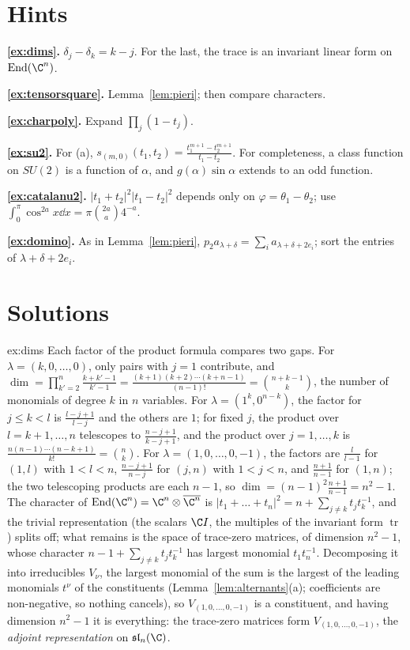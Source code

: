 \section{Hints}

\noindent\textbf{\ref{ex:dims}.} $\delta_j-\delta_k=k-j$. For the last, the trace is an invariant linear form on $\operatorname{End}(\C^n)$.

\noindent\textbf{\ref{ex:tensorsquare}.} Lemma~\ref{lem:pieri}; then compare characters.

\noindent\textbf{\ref{ex:charpoly}.} Expand $\prod_j(1-t_j)$.

\noindent\textbf{\ref{ex:su2}.} For (a), $s_{(m,0)}(t_1,t_2)=\frac{t_1^{m+1}-t_2^{m+1}}{t_1-t_2}$. For completeness, a class function on $SU(2)$ is a function of $\alpha$, and $g(\alpha)\sin\alpha$ extends to an odd function.

\noindent\textbf{\ref{ex:catalanu2}.} $|t_1+t_2|^2|t_1-t_2|^2$ depends only on $\varphi=\theta_1-\theta_2$; use $\int_0^\pi\cos^{2a}x\dd x=\pi\binom{2a}a4^{-a}$.

\noindent\textbf{\ref{ex:domino}.} As in Lemma~\ref{lem:pieri}, $p_2a_{\lambda+\delta}=\sum_ia_{\lambda+\delta+2e_i}$; sort the entries of $\lambda+\delta+2e_i$.

\section{Solutions}

\begin{solution}{ex:dims}
\idea Each factor of the product formula compares two gaps.
\writeup For $\lambda=(k,0,\dots,0)$, only pairs with $j=1$ contribute, and $\dim=\prod_{k'=2}^n\frac{k+k'-1}{k'-1}=\frac{(k+1)(k+2)\cdots(k+n-1)}{(n-1)!}=\binom{n+k-1}k$, the number of monomials of degree $k$ in $n$ variables. For $\lambda=(1^k,0^{n-k})$, the factor for
$j\le k<l$ is $\frac{l-j+1}{l-j}$ and the others are $1$; for fixed $j$, the product over $l=k+1,\dots,n$ telescopes to $\frac{n-j+1}{k-j+1}$, and the product over $j=1,\dots,k$ is $\frac{n(n-1)\cdots(n-k+1)}{k!}=\binom nk$. For $\lambda=(1,0,\dots,0,-1)$, the
factors are $\frac{l}{l-1}$ for $(1,l)$ with $1<l<n$, $\frac{n-j+1}{n-j}$ for $(j,n)$ with $1<j<n$, and $\frac{n+1}{n-1}$ for $(1,n)$; the two telescoping products are each $n-1$, so $\dim=(n-1)^2\frac{n+1}{n-1}=n^2-1$. The character of $\operatorname{End}(\C^n)=\C^n\otimes\overline{\C^n}$ is
$|t_1+\dots+t_n|^2=n+\sum_{j\ne k}t_jt_k^{-1}$, and the trivial representation (the scalars $\C I$, the multiples of the invariant form $\operatorname{tr}$) splits off; what remains is the space of trace-zero matrices, of dimension $n^2-1$, whose character
$n-1+\sum_{j\ne k}t_jt_k^{-1}$ has largest monomial $t_1t_n^{-1}$. Decomposing it into irreducibles $V_\nu$, the largest monomial of the sum is the largest of the leading monomials $t^\nu$ of the constituents (Lemma~\ref{lem:alternants}(a); coefficients are non-negative, so nothing cancels), so $V_{(1,0,\dots,0,-1)}$ is a constituent, and having dimension $n^2-1$ it is everything: the trace-zero matrices form $V_{(1,0,\dots,0,-1)}$, the \emph{adjoint representation} on $\mathfrak{sl}_n(\C)$.
\end{solution}

